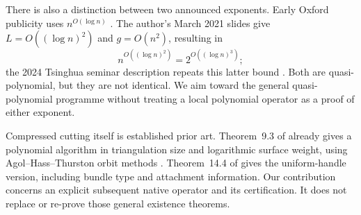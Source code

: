 There is also a distinction between two announced exponents.  Early Oxford
publicity uses $n^{O(\log n)}$ \cite{Oxford2021}.  The author's March 2021 slides
give $L=O((\log n)^2)$ and $g=O(n^2)$, resulting in
\begin{equation}\label{eq:announced}
       n^{O((\log n)^2)}=2^{O((\log n)^3)};
\end{equation}
the 2024 Tsinghua seminar description repeats this latter bound
\cite{LackenbySlides,Tsinghua2024}.  Both are quasi-polynomial, but they
are not identical.  We aim toward the general quasi-polynomial programme
without treating a local polynomial operator as a proof of either exponent.

Compressed cutting itself is established prior art.  Theorem~9.3 of
\cite{Lackenby2021} already gives a polynomial algorithm in triangulation
size and logarithmic surface weight, using Agol--Hass--Thurston orbit
methods \cite{AHT2006}.  Theorem~14.4 of \cite{Lackenby2026} gives the
uniform-handle version, including bundle type and attachment information.
Our contribution concerns an explicit subsequent native operator and its
certification.  It does not replace or re-prove those general existence
theorems.

